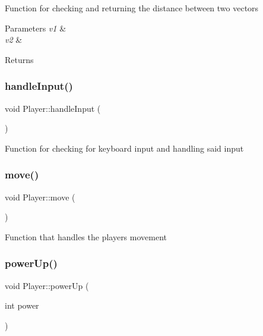 Function for checking and returning the distance between two vectors 


\begin{DoxyParams}{Parameters}
{\em v1} & \\
\hline
{\em v2} & \\
\hline
\end{DoxyParams}
\begin{DoxyReturn}{Returns}

\end{DoxyReturn}
\mbox{\label{class_player_a3c2e7e40fe2018229d44168bd484c182}} 
\subsubsection{\texorpdfstring{handleInput()}{handleInput()}}
{\footnotesize\ttfamily void Player\+::handle\+Input (\begin{DoxyParamCaption}{ }\end{DoxyParamCaption})}



Function for checking for keyboard input and handling said input 

\mbox{\label{class_player_ae02ee46d8c20dd0697b975f935b09839}} 
\subsubsection{\texorpdfstring{move()}{move()}}
{\footnotesize\ttfamily void Player\+::move (\begin{DoxyParamCaption}{ }\end{DoxyParamCaption})}



Function that handles the players movement 

\mbox{\label{class_player_af48714530f6a34bb3637d67edb781c70}} 
\subsubsection{\texorpdfstring{powerUp()}{powerUp()}}
{\footnotesize\ttfamily void Player\+::power\+Up (\begin{DoxyParamCaption}\item[{int}]{power }\end{DoxyParamCaption})}



